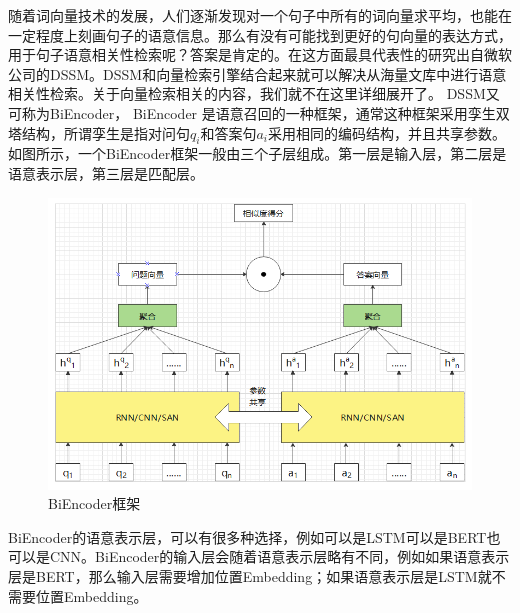 \documentclass[twoside,a4paper,12pt]{book}%
\begin{document}
随着词向量技术的发展，人们逐渐发现对一个句子中所有的词向量求平均，也能在一定程度上刻画句子的语意信息。那么有没有可能找到更好的句向量的表达方式，用于句子语意相关性检索呢？答案是肯定的。在这方面最具代表性的研究出自微软公司的DSSM。DSSM和向量检索引擎结合起来就可以解决从海量文库中进行语意相关性检索。关于向量检索相关的内容，我们就不在这里详细展开了。
DSSM又可称为BiEncoder，
BiEncoder 是语意召回的一种框架，通常这种框架采用孪生双塔结构，所谓孪生是指对问句$q_i$和答案句$a_i$采用相同的编码结构，并且共享参数。如图所示，一个BiEncoder框架一般由三个子层组成。第一层是输入层，第二层是语意表示层，第三层是匹配层。
\begin{figure}[h]
\begin{center}
\includegraphics[width=6.0in]{figures/bi-encoder1.png}
\caption{Bi\-Encoder框架}
\label{fig:bi-encoder1}
\end{center}
\end{figure}
BiEncoder的语意表示层，可以有很多种选择，例如可以是\gls{LSTM}可以是\gls{BERT}也可以是\gls{CNN}。BiEncoder的输入层会随着语意表示层略有不同，例如如果语意表示层是\gls{BERT}，那么输入层需要增加位置Embedding；如果语意表示层是\gls{LSTM}就不需要位置Embedding。
\end{document}
